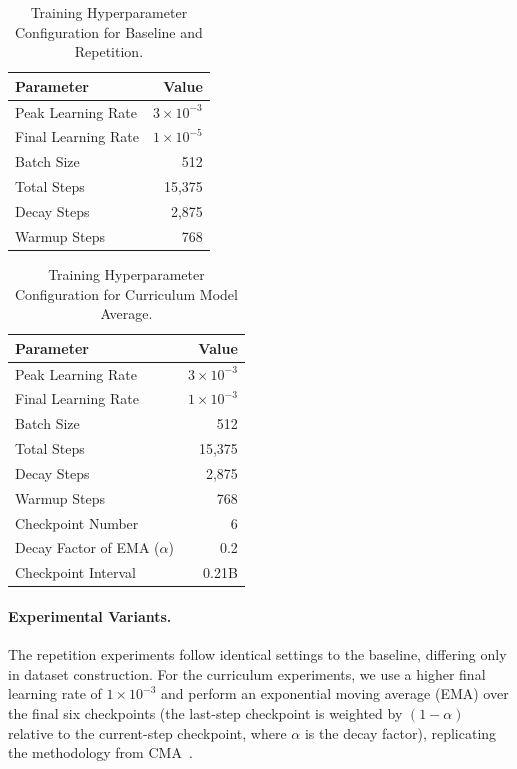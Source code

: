 \begin{table}[htbp]
\centering
\caption{Training Hyperparameter Configuration for Baseline and Repetition.}
\label{tab:1b5_setting}
\begin{tabular}{@{}lr@{}}
\toprule 
\textbf{Parameter} & \textbf{Value} \\
\midrule
Peak Learning Rate & $3\times 10^{-3}$ \\
Final Learning Rate & $1\times 10^{-5}$ \\
Batch Size & 512 \\
Total Steps & 15,375 \\
Decay Steps & 2,875 \\
Warmup Steps & 768 \\
\bottomrule
\end{tabular}
\end{table}

\begin{table}[htbp]
\centering
\caption{Training Hyperparameter Configuration for Curriculum Model Average.}
\label{tab:1b5_curriculum_setting}
\begin{tabular}{@{}lr@{}}
\toprule 
\textbf{Parameter} & \textbf{Value} \\
\midrule
Peak Learning Rate & $3\times 10^{-3}$ \\
Final Learning Rate & $1\times 10^{-3}$ \\
Batch Size & 512 \\
Total Steps & 15,375 \\
Decay Steps & 2,875 \\
Warmup Steps & 768 \\
Checkpoint Number & 6\\
Decay Factor of EMA ($\alpha$) & 0.2\\
Checkpoint Interval & 0.21B\\
\bottomrule
\end{tabular}
\end{table}

\paragraph{Experimental Variants.}
The repetition experiments follow identical settings to the baseline, differing only in dataset construction. For the curriculum experiments, we use a higher final learning rate of $1\times10^{-3}$ and perform an exponential moving average (EMA) over the final six checkpoints (the last-step checkpoint is weighted by $(1-\alpha)$ relative to the current-step checkpoint, where $\alpha$ is the decay factor), replicating the methodology from CMA~\citep{luo2025learningratedecaywastes}.

